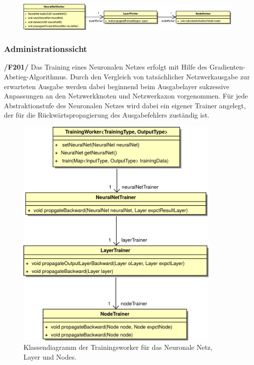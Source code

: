 \begin{figure}[H]
\begin{center}
\includegraphics[width=\textwidth]{Abbildungen/UML/uml_ronny/workerKlassenDiagramm.png}
\end{center}
\end{figure}

\subsubsection{Administrationssicht}

\textbf{/F201/} Das Training eines Neuronalen Netzes erfolgt mit Hilfe des Gradienten-Abstieg-Algorithmus. Durch den Vergleich von tatsächlicher Netzwerkausgabe zur erwarteten Ausgabe werden dabei beginnend beim Ausgabelayer sukzessive Anpassungen an den Netzwerkknoten und Netzwerkaxon vorgenommen. Für jede Abstraktionstufe des Neuronalen Netzes wird dabei ein eigener Trainer angelegt, der für die Rückwärtspropagierung des Ausgabefehlers zuständig ist.\\[-0.5cm]
\begin{figure}[H]
\begin{center}
\includegraphics[width=10cm]{Abbildungen/UML/jan/trainerCD.png}
\caption{Klassendiagramm der Trainingsworker für das Neuronale Netz, Layer und Nodes.}
\label{fig_cdTraining}
\end{center}
\end{figure}
